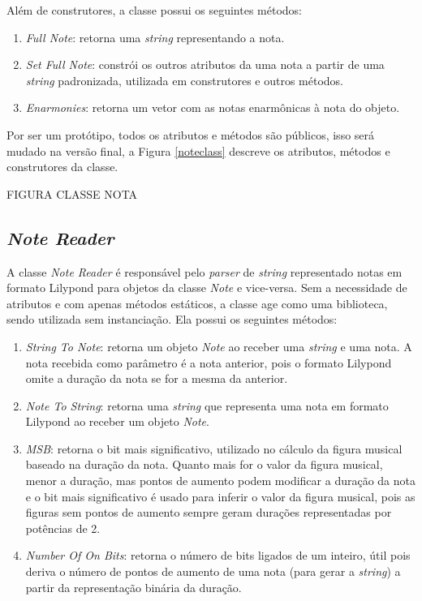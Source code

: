       Além de construtores, a classe possui os seguintes métodos:

      \begin{enumerate}
        \item \textit{Full Note}: retorna uma \textit{string} representando a nota.
        \item \textit{Set Full Note}: constrói os outros atributos da uma nota a partir de uma \textit{string} padronizada, utilizada em construtores e outros métodos.
        \item \textit{Enarmonies}: retorna um vetor com as notas enarmônicas à nota do objeto.
      \end{enumerate}

      Por ser um protótipo, todos os atributos e métodos são públicos, isso será mudado na versão final, a Figura \ref{noteclass} descreve os atributos, métodos e construtores da classe.

      FIGURA CLASSE NOTA

    \subsection[\textit{Note Reader}]{\textit{Note Reader}}


      A classe \textit{Note Reader} é responsável pelo \textit{parser} de \textit{string} representado notas em formato Lilypond para objetos da classe \textit{Note} e vice-versa. Sem a necessidade de atributos e com apenas métodos estáticos, a classe age como uma biblioteca, sendo utilizada sem instanciação. Ela possui os seguintes métodos:


      \begin{enumerate}
        \item \textit{String To Note}: retorna um objeto \textit{Note} ao receber uma \textit{string} e uma nota. A nota recebida como parâmetro é a nota anterior, pois o formato Lilypond omite a duração da nota se for a mesma da anterior.
        \item \textit{Note To String}: retorna uma \textit{string} que representa uma nota em formato Lilypond ao receber um objeto \textit{Note}.
        \item \textit{MSB}: retorna o bit mais significativo, utilizado no cálculo da figura musical baseado na duração da nota. Quanto mais for o valor da figura musical, menor a duração, mas pontos de aumento podem modificar a duração da nota e o bit mais significativo é usado para inferir o valor da figura musical, pois as figuras sem pontos de aumento sempre geram durações representadas por potências de 2.
        \item \textit{Number Of On Bits}: retorna o número de bits ligados de um inteiro, útil pois deriva o número de pontos de aumento de uma nota (para gerar a \textit{string}) a partir da representação binária da duração.
      \end{enumerate}

